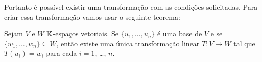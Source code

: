 \documentclass[12pt]{exam}
\begin{document}
    Portanto é possível existir uma transforma\c{c}ão com as condi\c{c}ões solicitadas. Para criar essa transforma\c{c}ão vamos usar o seguinte teorema:
    \begin{tcolorbox}[colback=green!30, colframe=green!80!blue, title=Teorema]
        Sejam $V$ e $W$ $\mathbb{K}$-espa\c{c}os vetoriais. Se $\{u_1, \dots, u_n\}$ é uma base de $V$ e se $\{w_1, \dots, w_n\} \subseteq W$, então existe uma única transforma\c{c}ão linear $T \colon V \to W$ tal que $T(u_i) = w_i$ para cada $i = 1$, \dots, $n$.
    \end{tcolorbox}
\end{document}
